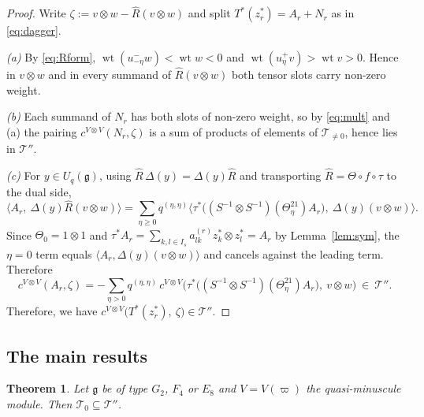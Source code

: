 \documentclass[12pt]{amsart}
\theoremstyle{plain}
\newtheorem{theorem}{Theorem}[section]
\theoremstyle{remark}
\newcommand{\g}{\mathfrak{g}}
\newcommand{\Uq}{U_q(\g)}
\newcommand{\wt}{\operatorname{wt}}
\newcommand{\ot}{\otimes}
\newcommand{\vp}{\varpi}
\newcommand{\Rhat}{\widehat{R}}
\begin{document}
\begin{proof}
Write $\zeta:=v\ot w-\Rhat(v\ot w)$ and split $T^*(z_r^*)=A_r+N_r$ as in
\eqref{eq:dagger}.

\emph{(a)} By \eqref{eq:Rform}, $\wt(u^-_{-\eta}w)<\wt w<0$ and
$\wt(u^+_\eta v)>\wt v>0$. Hence in $v\ot w$ and in every summand of
$\Rhat(v\ot w)$ both tensor slots carry non-zero weight.

\emph{(b)} Each summand of $N_r$ has both slots of non-zero weight, so by
\eqref{eq:mult} and (a) the pairing $c^{V\ot V}(N_r, \zeta)$ is a sum of products of
elements of $\mathscr{T}_{\neq0}$, hence lies in $\mathscr{T}''$.

\emph{(c)} For $y\in\Uq$, using $\Rhat\,\Delta(y)=\Delta(y)\Rhat$ and transporting
$\Rhat=\Theta\circ f\circ\tau$ to the dual side,
\[
\big\langle A_r,\ \Delta(y)\Rhat(v\ot w)\big\rangle
=\sum_{\eta\ge0}q^{(\eta,\eta)}\big\langle
\tau^*\big((S^{-1}\ot S^{-1})(\Theta_\eta^{21})A_r\big),\ \Delta(y)(v\ot w)\big\rangle .
\]
Since $\Theta_0=1\ot1$ and $\tau^*A_r=\sum_{k,l\in I_s}a^{(r)}_{lk}z_k^*\ot z_l^*=A_r$
by Lemma~\ref{lem:sym}, the $\eta=0$ term equals
$\big\langle A_r,\Delta(y)(v\ot w)\big\rangle$ and cancels against the leading term.
Therefore
\[
c^{V\ot V}(A_r,\zeta)=-\sum_{\eta>0}q^{(\eta,\eta)}\,
c^{V\ot V}\big(\tau^*\big((S^{-1}\ot S^{-1})(\Theta_\eta^{21})A_r\big),\ v\ot w\big)
\ \in\ \mathscr{T}''.
\]
Therefore, we have $c^{V\ot V}\big(T^*(z_r^*),\ \zeta\big)\in\mathscr{T}''$.
\end{proof}

\subsection*{The main results}

\begin{theorem}\label{thm:main}
Let $\g$ be of type $G_2$, $F_4$ or $E_8$ and $V=V(\vp)$ the quasi-minuscule module.
Then $\mathscr{T}_0\subseteq\mathscr{T}''$.
\end{theorem}
\end{document}
